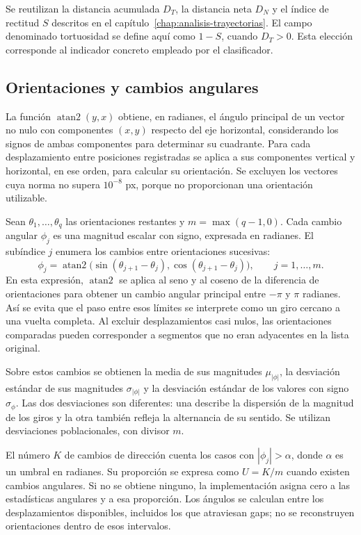 Se reutilizan la distancia acumulada $D_T$, la distancia neta $D_N$ y el índice de rectitud $S$ descritos en el capítulo~\ref{chap:analisis-trayectorias}. El campo denominado tortuosidad se define aquí como $1-S$, cuando $D_T>0$. Esta elección corresponde al indicador concreto empleado por el clasificador.

\subsection{Orientaciones y cambios angulares}

La función $\operatorname{atan2}(y,x)$ obtiene, en radianes, el ángulo principal de un vector no nulo con componentes $(x,y)$ respecto del eje horizontal, considerando los signos de ambas componentes para determinar su cuadrante. Para cada desplazamiento entre posiciones registradas se aplica a sus componentes vertical y horizontal, en ese orden, para calcular su orientación. Se excluyen los vectores cuya norma no supera $10^{-8}$ px, porque no proporcionan una orientación utilizable.

Sean $\theta_1,\ldots,\theta_q$ las orientaciones restantes y $m=\max(q-1,0)$. Cada cambio angular $\phi_j$ es una magnitud escalar con signo, expresada en radianes. El subíndice $j$ enumera los cambios entre orientaciones sucesivas:
\begin{equation}
  \phi_j=\operatorname{atan2}\bigl(\sin(\theta_{j+1}-\theta_j),
                                    \cos(\theta_{j+1}-\theta_j)\bigr),
  \qquad j=1,\ldots,m.
\end{equation}
En esta expresión, $\operatorname{atan2}$ se aplica al seno y al coseno de la diferencia de orientaciones para obtener un cambio angular principal entre $-\pi$ y $\pi$ radianes. Así se evita que el paso entre esos límites se interprete como un giro cercano a una vuelta completa. Al excluir desplazamientos casi nulos, las orientaciones comparadas pueden corresponder a segmentos que no eran adyacentes en la lista original.

Sobre estos cambios se obtienen la media de sus magnitudes $\mu_{|\phi|}$, la desviación estándar de sus magnitudes $\sigma_{|\phi|}$ y la desviación estándar de los valores con signo $\sigma_\phi$. Las dos desviaciones son diferentes: una describe la dispersión de la magnitud de los giros y la otra también refleja la alternancia de su sentido. Se utilizan desviaciones poblacionales, con divisor $m$.

El número $K$ de cambios de dirección cuenta los casos con $|\phi_j|>\alpha$, donde $\alpha$ es un umbral en radianes. Su proporción se expresa como $U=K/m$ cuando existen cambios angulares. Si no se obtiene ninguno, la implementación asigna cero a las estadísticas angulares y a esa proporción. Los ángulos se calculan entre los desplazamientos disponibles, incluidos los que atraviesan gaps; no se reconstruyen orientaciones dentro de esos intervalos.


